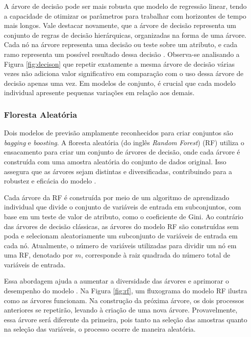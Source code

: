  A árvore de decisão pode ser mais robusta que modelo de regressão linear, tendo a capacidade de otimizar os parâmetros para trabalhar com horizontes de tempo mais longos. Vale destacar novamente, que a árvore de decisão representa um conjunto de regras de decisão hierárquicas, organizadas na forma de uma árvore. Cada nó na árvore representa uma decisão ou teste sobre um atributo, e cada ramo representa um possível resultado dessa decisão \cite{GIFFORD2023100296}. Observa-se analisando a Figura \ref{fig:decison} que repetir exatamente a mesma árvore de decisão várias vezes não adiciona valor significativo em comparação com o uso dessa árvore de decisão apenas uma vez. Em modelos de conjunto, é crucial que cada modelo individual apresente pequenas variações em relação aos demais.
  
 \subsubsection{Floresta Aleat\'oria} \label{subsubsec:rf}
 
Dois modelos de previsão amplamente reconhecidos para criar conjuntos são \textit{bagging} e \textit{boosting}. A floresta aleatória (do inglês \textit{Random Forest}) (RF) utiliza o ensacamento para criar um conjunto de árvores de decisão, onde cada árvore é construída com uma amostra aleatória do conjunto de dados original. Isso assegura que as árvores sejam distintas e diversificadas, contribuindo para a robustez e eficácia do modelo \cite{SEMAN2023109269}.
 
 Cada árvore da RF é construída por meio de um algoritmo de aprendizado individual que divide o conjunto de variáveis de entrada em subconjuntos, com base em um teste de valor de atributo, como o coeficiente de Gini. Ao contrário das árvores de decisão clássicas, as árvores do modelo RF são construídas sem poda e selecionam aleatoriamente um subconjunto de variáveis de entrada em cada nó. Atualmente, o número de variáveis utilizadas para dividir um nó em uma RF, denotado por $m$, corresponde à raiz quadrada do número total de variáveis de entrada. 
 
 Essa abordagem ajuda a aumentar a diversidade das árvores e aprimorar o desempenho do modelo \cite{Pelletier2016156}. Na Figura \ref{fig:rf}, um fluxograma do modelo RF ilustra como as árvores funcionam.
 Na construção da próxima árvore, os dois processos anteriores se repetirão, levando à criação de uma nova árvore. Provavelmente, essa árvore será diferente da primeira, pois tanto na seleção das amostras quanto na seleção das variáveis, o processo ocorre de maneira aleatória.
  
